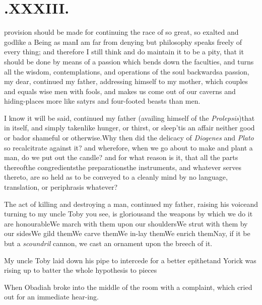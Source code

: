 \documentclass{article}
\begin{document}
\vfill{}\eject
\null{}\baselineskip
\section{.\enspace XXXIII.}

provision should be
made for continuing the race
of so great, so exalted and godlike a
Being as man\tsk I am far from denying\tsk\break
but philosophy speaks freely of every thing; and therefore I still think and do
maintain it to be a pity, that it should be done by means of a
passion which bends down the faculties, and turns all the wisdom,
contemplations, and opera\-tions of the soul backwards\tsh a
passion, my dear, continued my father, addressing himself to my
mother, which couples and equals wise men with fools, and makes us
come out of our caverns and hiding-places more like satyrs and
four-footed beasts than men.\etp{}

I know it will be said, continued my father (availing himself of
the \textit{Prolepsis})\break that in itself, and simply
taken\tsh like hunger, or thirst, or sleep\tsh ’tis an affair
neither good or bad\tsk or shameful or otherwise.\tsh Why then
did the delicacy of \textit{Diogenes} and \textit{Plato} so
recalcitrate against it? and wherefore, when we go about to make
and plant a man, do we put out the candle? and for what reason
is it, that all the parts thereof\tsk the congredients\tsk the
preparations\tsk the instruments, and whatever serves thereto,
are so held as to be conveyed to a cleanly mind by no language,
translation, or periphrasis whatever?

\tsh The act of killing and destroying a man, continued
my father, raising his voice\tsk and turning to my uncle
Toby\tsk\etp{} you see, is glorious\tsk and the weapons by
which we do it are honourable\tsh We march with them upon
our shoulders\tsk\break We strut with them by our
sides\tsh We gild them\tsh We carve
them\tsh We in-lay them\tsh We enrich
them\tsh\break Nay, if it be but a \textit{scoundril} cannon, we
cast an ornament upon the breech of it.\tsk

\tsh My uncle Toby laid down his pipe to
intercede for a better epithet\tsh\break and Yorick was
rising up to batter the whole hypothesis to
pieces\tsh

\tsh When Obadiah broke into the middle of the
room with a complaint, which cried out for an immediate
hear-\break ing.
\end{document}
